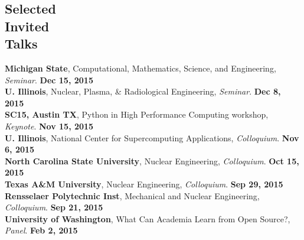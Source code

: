\documentclass[margin,line]{resume}
\begin{document}
\begin{resume}
    \section{\mysidestyle Selected\\Invited\\Talks}
      \textbf{Michigan State}, Computational, Mathematics, Science, and Engineering, \emph{Seminar}.  \hfill\textbf{Dec 15, 2015}\\
      \textbf{U. Illinois}, Nuclear, Plasma, \& Radiological Engineering, \emph{Seminar}.          \hfill\textbf{Dec 8, 2015}\\
      \textbf{SC15, Austin TX}, Python in High Performance Computing workshop, \emph{Keynote}.     \hfill\textbf{Nov 15, 2015}\\
      \textbf{U. Illinois}, National Center for Supercomputing Applications, \emph{Colloquium}.    \hfill\textbf{Nov 6, 2015}\\
      \textbf{North Carolina State University}, Nuclear Engineering, \emph{Colloquium}.            \hfill\textbf{Oct 15, 2015}\\
      \textbf{Texas A\&M University}, Nuclear Engineering, \emph{Colloquium}.                      \hfill\textbf{ Sep 29, 2015}\\
      \textbf{Rensselaer Polytechnic Inst}, Mechanical and Nuclear Engineering, \emph{Colloquium}. \hfill\textbf{Sep 21, 2015}\\
      \textbf{University of Washington}, What Can Academia Learn from Open Source?, \emph{Panel}.   \hfill\textbf{Feb 2, 2015}

\end{resume}
\end{document}
